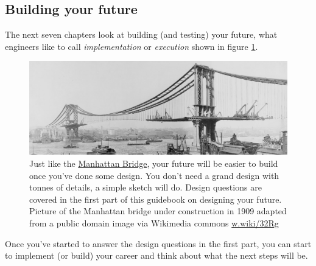 \documentclass[
]{book}
\begin{document}
\hypertarget{partii}{%
\subsection{Building your future}\label{partii}}

The next seven chapters look at building (and testing) your future, what engineers like to call \emph{implementation} or \emph{execution} shown in figure \ref{fig:manhattan-fig}.

\begin{figure}

{\centering \includegraphics[width=1\linewidth]{images/manhattan_bridge} 

}

\caption{Just like the \href{https://en.wikipedia.org/wiki/Manhattan_Bridge}{Manhattan Bridge}, your future will be easier to build once you've done some design. You don't need a grand design with tonnes of details, a simple sketch will do. Design questions are covered in the first part of this guidebook on designing your future. Picture of the Manhattan bridge under construction in 1909 adapted from a public domain image via Wikimedia commons \href{https://w.wiki/32Rg}{w.wiki/32Rg}}\label{fig:manhattan-fig}
\end{figure}



Once you've started to answer the design questions in the first part, you can start to implement (or build) your career and think about what the next steps will be.
\end{document}
